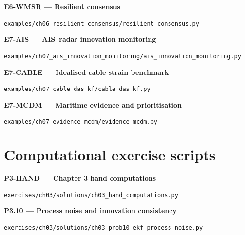 \documentclass[graybox,envcountchap]{style/SNmono}
\newcommand{\repopath}[1]{\texttt{#1}}
\begin{document}
\par\medskip{}\label{code:E6-WMSR}
\noindent\textbf{E6-WMSR --- Resilient consensus}\par
\noindent\repopath{examples/\allowbreak ch06\_\allowbreak resilient\_\allowbreak consensus/\allowbreak resilient\_\allowbreak consensus.py}\par

\par\medskip{}\label{code:E7-AIS}
\noindent\textbf{E7-AIS --- AIS--radar innovation monitoring}\par
\noindent\repopath{examples/\allowbreak ch07\_\allowbreak ais\_\allowbreak innovation\_\allowbreak monitoring/\allowbreak ais\_\allowbreak innovation\_\allowbreak monitoring.py}\par

\par\medskip{}\label{code:E7-CABLE}
\noindent\textbf{E7-CABLE --- Idealised cable strain benchmark}\par
\noindent\repopath{examples/\allowbreak ch07\_\allowbreak cable\_\allowbreak das\_\allowbreak kf/\allowbreak cable\_\allowbreak das\_\allowbreak kf.py}\par

\par\medskip{}\label{code:E7-MCDM}
\noindent\textbf{E7-MCDM --- Maritime evidence and prioritisation}\par
\noindent\repopath{examples/\allowbreak ch07\_\allowbreak evidence\_\allowbreak mcdm/\allowbreak evidence\_\allowbreak mcdm.py}\par

\section*{Computational exercise scripts}

\par\medskip{}\label{code:P3-HAND}
\noindent\textbf{P3-HAND --- Chapter 3 hand computations}\par
\noindent\repopath{exercises/\allowbreak ch03/\allowbreak solutions/\allowbreak ch03\_\allowbreak hand\_\allowbreak computations.py}\par

\par\medskip{}\label{code:P3.10}
\noindent\textbf{P3.10 --- Process noise and innovation consistency}\par
\noindent\repopath{exercises/\allowbreak ch03/\allowbreak solutions/\allowbreak ch03\_\allowbreak prob10\_\allowbreak ekf\_\allowbreak process\_\allowbreak noise.py}\par
\end{document}
